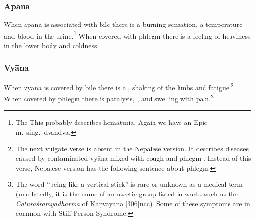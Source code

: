 \begin{translation}
\subsubsection{Apāna}

\item[37cd--38ab]

	When apāna is associated with bile  there is a burning sensation, a temperature 
	and blood in the urine.\footnote{The This probably describes hematuria.  Again 
	we have an Epic m.\ sing.\ dvandva.}
     When  covered with phlegm there is a feeling of
	heaviness in the lower body and coldness.




\subsubsection{Vyāna}

\item[38cd--39.1]

When vyāna is covered by bile there is a ,
shaking of the limbs and fatigue.\footnote{The next vulgate verse is
    absent in the Nepalese version.  It describes diseases caused by
    contaminated vyāna mixed with cough and phlegm \citep[264]{vulgate}.
    Instead of this verse, Nepalese version has the following sentence
    about phlegm.} When covered by phlegm there is paralysis,
    , and swelling with pain.\footnote{The word
         “being like a vertical stick” is rare or unknown as a
        medical term (unrelatedly, it is the name of an ascetic group listed
        in works such as the \emph{Cāturāśramyadharma} of Kāṇvāyana 
        [306]{ncc}). Some of
        these symptoms are in common with Stiff Person Syndrome.}
 

\item[40--41]


\end{translation}
